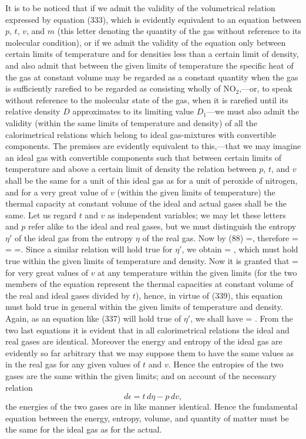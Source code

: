 \documentclass[12pt]{article}
\begin{document}
It is to be noticed that if we admit the validity of the volumetrical relation expressed by equation (333), which is evidently equivalent to an equation between $p$, $t$, $v$, and $m$ (this letter denoting the quantity of the gas without reference to its molecular condition), or if we admit the validity of the equation only between certain limits of temperature and for densities less than a certain limit of density, and also admit that between the given limits of temperature the specific heat of the gas at constant volume may be regarded as a constant quantity when the gas is sufficiently rarefied to be regarded as consisting wholly of NO$_2$,---or, to speak without reference to the molecular state of the gas, when it is rarefied until its relative density $D$ approximates to its limiting value $D_1$---we must also admit the validity (within the same limits of temperature and density) of all the calorimetrical relations which belong to ideal gas-mixtures with convertible components. The premises are evidently equivalent to this,---that we may imagine an ideal gas with convertible components such that between certain limits of temperature and above a certain limit of density the relation between $p$, $t$, and $v$ shall be the same for a unit of this ideal gas as for a unit of peroxide of nitrogen, and for a very great value of $v$ (within the given limits of temperature) the thermal capacity at constant volume of the ideal and actual gases shall be the same. Let us regard $t$ and $v$ as independent variables; we may let these letters and $p$ refer alike to the ideal and real gases, but we must distinguish the entropy $\eta'$ of the ideal gas from the entropy $\eta$ of the real gas. Now by (88)
\eqs {}=,          \label{337}\eqe
therefore          
\eqs  {} =  =   =.   \label{338}\eqe
Since a similar relation will hold true for $\eta'$, we obtain
\eqs {} = , \label{339}\eqe
which must hold true within the given limits of temperature and density. Now it is granted that
\eqs {} = \label{340}\eqe
for very great values of $v$ at any temperature within the given limits (for the two members of the equation represent the thermal capacities at constant volume of the real and ideal gases divided by $t$), hence, in virtue of (339), this equation must hold true in general within the given limits of temperature and density. Again, as an equation like (337) will hold true of $\eta'$, we shall have
\eqs {} = . \label{341}\eqe
From the two last equations it is evident that in all calorimetrical relations the ideal and real gases are identical. Moreover the energy and entropy of the ideal gas are evidently so far arbitrary that we may suppose them to have the same values as in the real gas for any given values of $t$ and $v$. Hence the entropies of the two gases are the same within the given limits; and on account of the necessary relation
$$d\epsilon = t \,d\eta-p \, dv,$$
the energies of the two gases are in like manner identical. Hence the fundamental equation between the energy, entropy, volume, and quantity of matter must be the same for the ideal gas as for the actual.
\end{document}
